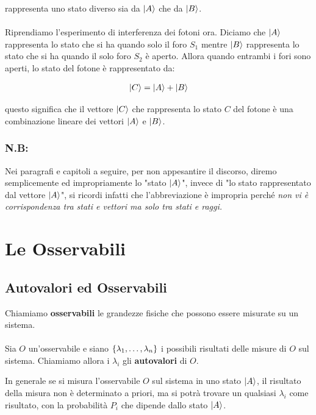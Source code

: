 	rappresenta uno stato diverso sia da $\ket{A}$ che da $\ket{B}$. 
	\\
	\\
	Riprendiamo l'esperimento di interferenza dei fotoni ora. Diciamo che $\ket{A}$ rappresenta lo stato che si ha quando solo il foro $S_1$ mentre $\ket{B}$ rappresenta lo stato che si ha quando il solo foro $S_2$ è aperto. Allora quando entrambi i fori sono aperti, lo stato del fotone è rappresentato da:
	
\begin{align*}
	\ket{C} = \ket{A} + \ket{B}
\end{align*}

	questo significa che il vettore $\ket{C}$ che rappresenta lo stato $C$ del fotone è una combinazione lineare dei vettori $\ket{A}$ e $\ket{B}$.
	
\subsubsection{N.B:}

	Nei paragrafi e capitoli a seguire, per non appesantire il discorso, diremo semplicemente ed impropriamente lo "stato $\ket{A}$", invece di "lo stato rappresentato dal vettore $\ket{A}$", si ricordi infatti che l'abbreviazione è impropria perché \textit{non vi è corrispondenza tra stati e vettori ma solo tra stati e raggi.}
	
\newpage

\section{Le Osservabili}

\subsection{Autovalori ed Osservabili}
	
\begin{mydef}
	Chiamiamo \textbf{osservabili} le grandezze fisiche che possono essere misurate su un sistema. 
	\\
	\\
	Sia $O$ un'osservabile e siano $\qty{\lambda_1, \dots, \lambda_n}$ i possibili risultati delle misure di $O$ sul sistema. Chiamiamo allora i $\lambda_i$ gli \textbf{autovalori} di $O$.
\end{mydef}

	In generale se si misura l'osservabile $O$ sul sistema in uno stato $\ket{A}$, il risultato della misura non è determinato a priori, ma si potrà trovare un qualsiasi $\lambda_i$ come risultato, con la probabilità $P_i$ che dipende dallo stato $\ket{A}$.
	
